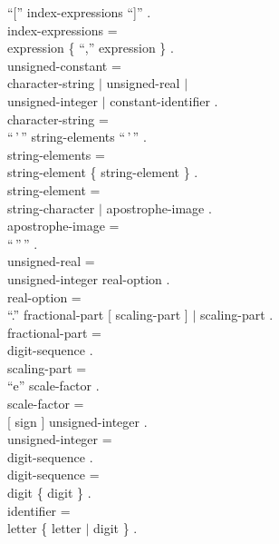 \begin{grammar}
    {\GB}``['' index-expressions ``]'' .                  \\
  {\GA}index-expressions =                                \\
    {\GB}expression \{ ``,'' expression \} .              \\
  {\GA}unsigned-constant =                                \\
    {\GB}character-string $|$ unsigned-real $|$           \\
    {\GB}unsigned-integer $|$ constant-identifier .       \\
  {\GA}character-string =                                 \\
    {\GB}``\,'\,'' string-elements ``\,'\,'' .            \\
  {\GA}string-elements =                                  \\
    {\GB}string-element \{ string-element \} .            \\
  {\GA}string-element =                                   \\
    {\GB}string-character $|$ apostrophe-image .          \\
  {\GA}apostrophe-image =                                 \\
    {\GB}``\,''\,'' .                                     \\
  {\GA}unsigned-real =                                    \\
    {\GB}unsigned-integer real-option .                   \\
  {\GA}real-option =                                      \\
    {\GB}``.'' fractional-part [ scaling-part ] $|$
         scaling-part .                                   \\
  {\GA}fractional-part =                                  \\
    {\GB}digit-sequence .                                 \\
  {\GA}scaling-part =                                     \\
    {\GB}``e'' scale-factor .                             \\
  {\GA}scale-factor =                                     \\
    {\GB}[ sign ] unsigned-integer .                      \\
  {\GA}unsigned-integer =                                 \\
    {\GB}digit-sequence .                                 \\
  {\GA}digit-sequence =                                   \\
    {\GB}digit \{ digit \} .                              \\
  {\GA}identifier =                                       \\
    {\GB}letter \{ letter $|$ digit \} .                  \\
\end{grammar}


